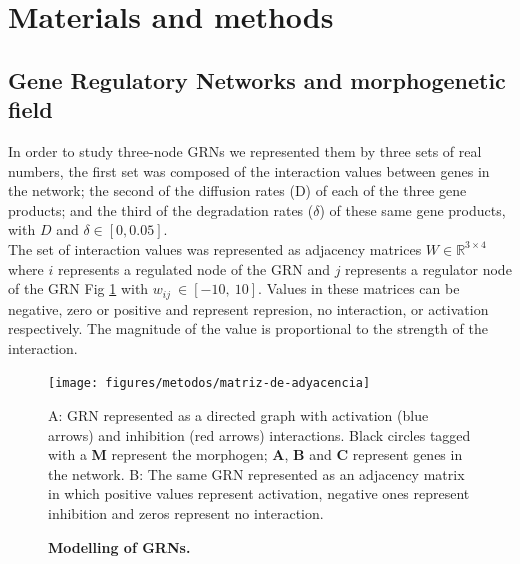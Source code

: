 \documentclass[10pt,letterpaper]{article}
\begin{document}

\section*{Materials and methods}
\subsection*{Gene Regulatory Networks and morphogenetic field}

In order to study three-node GRNs we represented them by three sets of real 
numbers, the first set was composed of the interaction values
between genes in the network; the second of the diffusion rates (D) of each of 
the three gene products; and the third of the degradation rates ($\delta$) of 
these same gene products, with $D$ and $\delta  \in [0, 0.05]$.\\

The set of interaction values was represented as adjacency matrices $W \in 
\mathbb{R}^{3\times4}$ where $i$ represents a regulated node of the GRN and $j$ 
represents a regulator node of the GRN Fig \ref{fig:adjmat} with 
$w_{\textit{ij}}~\in [-10,\ 10]$. Values in these matrices can be negative, zero
or positive and represent represion, no interaction, or activation respectively.
The magnitude of the value is proportional to the strength of the interaction.\\

\begin{figure}[!h]
 \texttt{[image: figures/metodos/matriz-de-adyacencia]}
    \caption{\bf Modelling of GRNs.}
    A: GRN represented as a directed graph with activation (blue arrows) and 
    inhibition (red arrows) interactions. Black circles
    tagged with a \textbf{M} represent the morphogen; \textbf{A}, \textbf{B} and
    \textbf{C} represent genes in the network.
    B: The same GRN represented as an adjacency matrix in which positive values 
    represent activation, negative ones represent inhibition and
    zeros represent no interaction.
 \label{fig:adjmat}
\end{figure}
\end{document}
